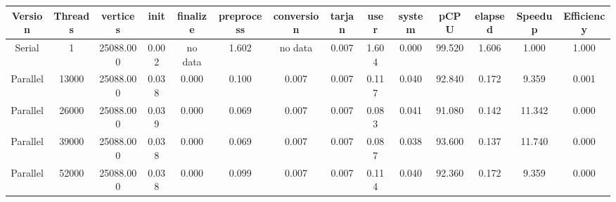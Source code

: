\begin{tabular}{|c|c|c|c|c|c|c|c|c|c|c|c|c|c|}
\toprule
 Version &  Threads &  vertices &  init & finalize &  preprocess & conversion &  tarjan &  user &  system &   pCPU &  elapsed &  Speedup &  Efficiency \\
\midrule
  Serial &        1 & 25088.000 & 0.002 &  no data &       1.602 &    no data &   0.007 & 1.604 &   0.000 & 99.520 &    1.606 &    1.000 &       1.000 \\
Parallel &    13000 & 25088.000 & 0.038 &    0.000 &       0.100 &      0.007 &   0.007 & 0.117 &   0.040 & 92.840 &    0.172 &    9.359 &       0.001 \\
Parallel &    26000 & 25088.000 & 0.039 &    0.000 &       0.069 &      0.007 &   0.007 & 0.083 &   0.041 & 91.080 &    0.142 &   11.342 &       0.000 \\
Parallel &    39000 & 25088.000 & 0.038 &    0.000 &       0.069 &      0.007 &   0.007 & 0.087 &   0.038 & 93.600 &    0.137 &   11.740 &       0.000 \\
Parallel &    52000 & 25088.000 & 0.038 &    0.000 &       0.099 &      0.007 &   0.007 & 0.114 &   0.040 & 92.360 &    0.172 &    9.359 &       0.000 \\
\bottomrule
\end{tabular}
